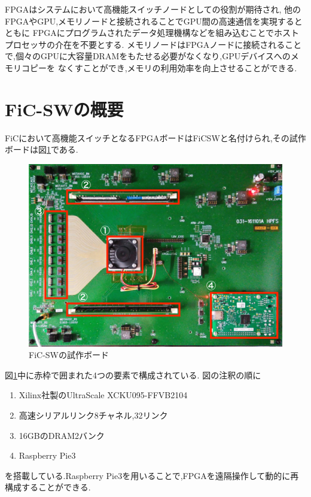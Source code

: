 {  FPGAはシステムにおいて高機能スイッチノードとしての役割が期待され,
  他のFPGAやGPU,メモリノードと接続されることでGPU間の高速通信を実現するとともに
  FPGAにプログラムされたデータ処理機構などを組み込むことでホストプロセッサの介在を不要とする.
  メモリノードはFPGAノードに接続されることで,個々のGPUに大容量DRAMをもたせる必要がなくなり,GPUデバイスへのメモリコピーを
  なくすことができ,メモリの利用効率を向上させることができる.
  
  \section{FiC-SWの概要}
  \label{sec:about_ficsw}
  FiCにおいて高機能スイッチとなるFPGAボードはFiCSWと名付けられ,その試作ボードは図\ref{fig:ficsw}である.
  
  \begin{figure}[h]
    \centering
    \includegraphics[width=12cm]{./chap3/fig/ficsw.png}
    \caption{FiC-SWの試作ボード}
    \label{fig:ficsw}
  \end{figure}
  
  図\ref{fig:ficsw}中に赤枠で囲まれた4つの要素で構成されている.
  図の注釈の順に
  \begin{enumerate}
    \item Xilinx社製のUltraScale XCKU095-FFVB2104
    \item 高速シリアルリンク8チャネル,32リンク
    \item 16GBのDRAM2バンク
    \item Raspberry Pie3
  \end{enumerate}
  を搭載している.Raspberry Pie3を用いることで,FPGAを遠隔操作して動的に再構成することができる.
  
}
